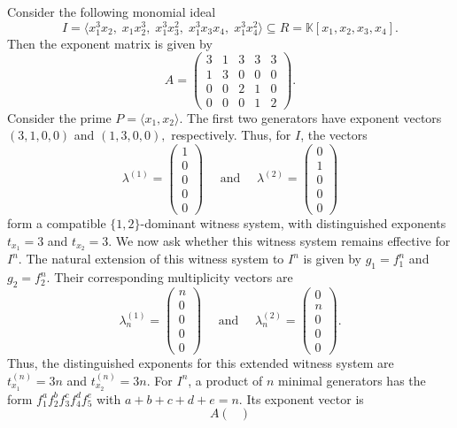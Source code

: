 \documentclass[11pt]{amsart}   %
\begin{document}
\begin{exm} \label{Example-3} Consider the following monomial ideal
\[
I=\langle x_1^3x_2,\;x_1x_2^3,\;x_1^3x_3^2,\;
x_1^3x_3x_4,\;x_1^3x_4^2\rangle
\subseteq R=\mathbb K[x_1,x_2,x_3,x_4].
\]
Then the exponent matrix is given by
\[
A=
\begin{pmatrix}
3&1&3&3&3\\
1&3&0&0&0\\
0&0&2&1&0\\
0&0&0&1&2
\end{pmatrix}.
\]
Consider the prime $P=\langle x_1,x_2\rangle$. The first two generators have
exponent vectors $(3,1,0,0)$ and $(1,3,0,0),$ respectively. Thus, for $I$, the vectors
\[
\lambda^{(1)}
=
\begin{pmatrix}
1\\
0\\
0\\
0\\
0
\end{pmatrix}
\quad \text{ and } \quad
\lambda^{(2)}
=
\begin{pmatrix}
0\\
1\\
0\\
0\\
0
\end{pmatrix}
\]
form a compatible $\{1,2\}$-dominant witness system, with distinguished
exponents  $t_{x_1}=3$ and $t_{x_2}=3.$  We now ask whether this witness system remains effective for $I^n$.
The natural extension of this witness system to $I^n$ is given by $g_1=f_1^n$ and  $g_2=f_2^n.$
Their corresponding multiplicity vectors are
\[
\lambda^{(1)}_n=
\begin{pmatrix}
n\\
0\\
0\\
0\\
0
\end{pmatrix}
\quad \text{ and } \quad
\lambda^{(2)}_n=
\begin{pmatrix}
0\\
n\\
0\\
0\\
0
\end{pmatrix}.
\]
Thus, the distinguished exponents for this extended witness system are
 $t_{x_1}^{(n)}=3n$ and $t_{x_2}^{(n)}=3n.$ For $I^n$, a product of $n$ minimal generators has the form
 $f_1^a f_2^b f_3^c f_4^d f_5^e$ with $a+b+c+d+e=n.$ Its exponent vector is
\[
A
\begin{pmatrix}

\end{pmatrix}\]
\end{exm}
\end{document}
